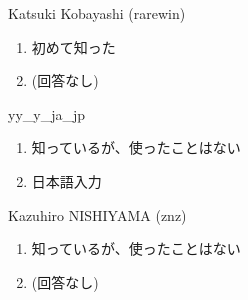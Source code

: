 \begin{prework}{ Katsuki Kobayashi (rarewin) }
  \begin{enumerate}
  \item 初めて知った
  \item (回答なし)
  \end{enumerate}
\end{prework}

\begin{prework}{ yy\_y\_ja\_jp }
  \begin{enumerate}
  \item 知っているが、使ったことはない
  \item 日本語入力
  \end{enumerate}
\end{prework}

\begin{prework}{ Kazuhiro NISHIYAMA (znz) }
  \begin{enumerate}
  \item 知っているが、使ったことはない
  \item (回答なし)
  \end{enumerate}
\end{prework}
